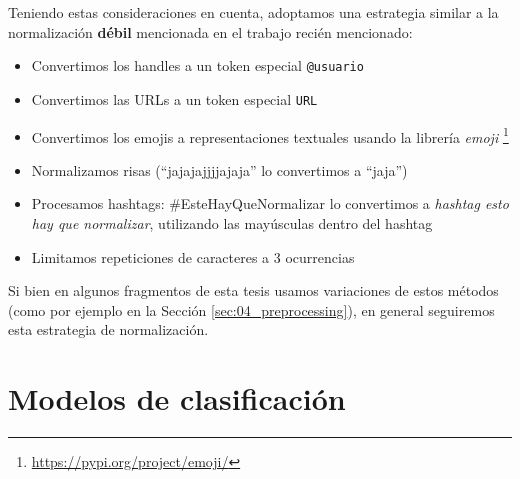 Teniendo estas consideraciones en cuenta, adoptamos una estrategia similar a la normalización \textbf{débil} mencionada en el trabajo recién mencionado:

\begin{itemize}
    \item Convertimos los handles a un token especial \verb|@usuario|
    \item Convertimos las URLs a un token especial \verb|URL|
    \item Convertimos los emojis a representaciones textuales usando la librería \emph{emoji} \footnote{\url{https://pypi.org/project/emoji/}}
    \item Normalizamos risas (``jajajajjjjajaja'' lo convertimos a ``jaja'')
    \item Procesamos hashtags: \#EsteHayQueNormalizar lo convertimos a \emph{hashtag esto hay que normalizar}, utilizando las mayúsculas dentro del hashtag
    \item Limitamos repeticiones de caracteres a 3 ocurrencias
\end{itemize}

Si bien en algunos fragmentos de esta tesis usamos variaciones de estos métodos (como por ejemplo en la Sección \ref{sec:04_preprocessing}), en general seguiremos esta estrategia de normalización.

\section{Modelos de clasificación}
\label{sec:03_classification}

